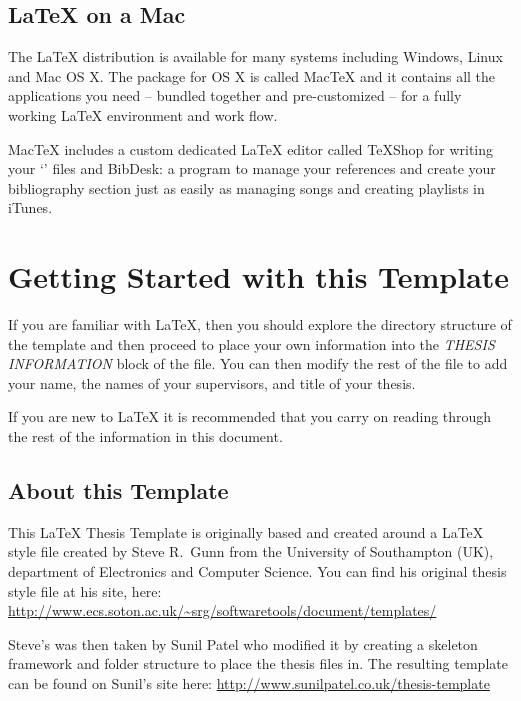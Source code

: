 \subsection{\LaTeX{} on a Mac}
 
The \LaTeX{} distribution is available for many systems including
Windows, Linux and Mac OS X. The package for OS X is called MacTeX and
it contains all the applications you need -- bundled together and
pre-customized -- for a fully working \LaTeX{} environment and work
flow.
 
MacTeX includes a custom dedicated \LaTeX{} editor called TeXShop for
writing your `' files and BibDesk: a program to manage your
references and create your bibliography section just as easily as
managing songs and creating playlists in iTunes.


\section{Getting Started with this Template}
\label{sec:started}

If you are familiar with \LaTeX{}, then you should explore the directory
structure of the template and then proceed to place your own information
into the \emph{THESIS INFORMATION} block of the 
file. You can then modify the rest of the file to add your name, the
names of your supervisors, and title of your thesis. 

If you are new to \LaTeX{} it is recommended that you carry on reading
through the rest of the information in this document.

\subsection{About this Template}

This \LaTeX{} Thesis Template is originally based and created around a
\LaTeX{} style file created by Steve R.\ Gunn from the University of
Southampton (UK), department of Electronics and Computer Science. You
can find his original thesis style file at his site, here:
\url{http://www.ecs.soton.ac.uk/~srg/softwaretools/document/templates/}

Steve's  was then taken by Sunil Patel who modified
it by creating a skeleton framework and folder structure to place the
thesis files in. The resulting template can be found on Sunil's site
here: \url{http://www.sunilpatel.co.uk/thesis-template}

